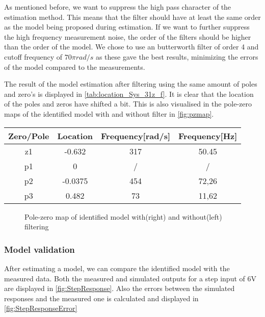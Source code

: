 \documentclass[a4paper]{article}
\newcommand{\newpar}{\vspace{.3cm}\noindent}
\begin{document}
\newpar
As mentioned before, we want to suppress the high pass character of the estimation method. This means that the filter should have at least the same order as the model being proposed during estimation. If we want to further suppress the high frequency measurement noise, the order of the filters should be higher than the order of the model. We chose to use an butterworth filter of order 4 and cutoff frequency of $70\pi rad/s$ as these gave the best results, minimizing the errors of the model compared to the measurements. 

\newpar
The result of the model estimation after filtering using the same amount of poles and zero's is displayed in \autoref{tab:location_Sys_31z_f}. It is clear that the location of the poles and zeros have shifted a bit. This is also visualised in the pole-zero maps of the identified model with and  without filter in \autoref{fig:pzmap}.

\begin{center}
    \begin{tabular}{ |c|c|c|c|}
    \hline
    Zero/Pole & Location & Frequency{[}rad/s{]} & Frequency{[}Hz{]}  \\
    \hline
    z1        & -0.632    & 317                 &  50.45           \\
    \hline
    p1        & 0         & /                   & /                 \\
    \hline
    p2        & -0.0375   & 454                 & 72,26            \\
    \hline
    p3        & 0.482     & 73                  & 11,62           \\ 
    \hline
    \end{tabular}  
    \label{tab:location_Sys_31z_f}
\end{center}

\begin{figure}[H]
    \caption{Pole-zero map of identified model with(right) and without(left) filtering}
    \label{fig:pzmap}
\end{figure}

\subsubsection{Model validation}
After estimating a model, we can compare the identified model with the measured data. Both the measured and simulated outputs for a step input of 6V are displayed in \autoref{fig:StepResponse}. Also the errors between the simulated responses and the measured one is calculated and displayed in \autoref{fig:StepResponseError}
\end{document}
